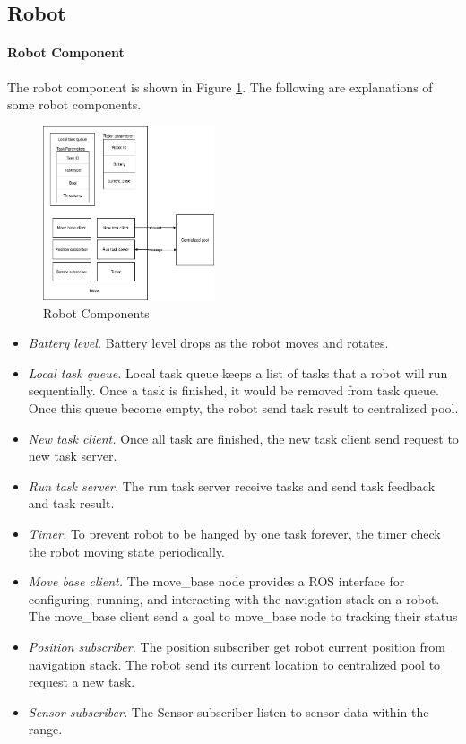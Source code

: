 \subsection{Robot}
\paragraph{Robot Component} The robot component is shown in Figure \ref{fig:robot_components}. The following are explanations of some robot components.


\begin{figure}[htbp]
	\centering
	\includegraphics[width = 0.45\textwidth]{content/images/ch4/system_component_robot.drawio.png}
	\caption{Robot Components}
	\label{fig:robot_components}
\end{figure}

\begin{itemize}
	\item \textsl{Battery level.} Battery level drops as the robot moves and rotates.
	\item \textsl{Local task queue.} Local task queue keeps a list of tasks that a robot will run sequentially. Once a task is finished, it would be removed from task queue. Once this queue become empty, the robot send task result to centralized pool.
	\item \textsl{New task client.} Once all task are finished, the new task client send request to new task server.
	\item \textsl{Run task server.} The run task server receive tasks and send task feedback and task result.
	\item \textsl{Timer.} To prevent robot to be hanged by one task forever, the timer check the robot moving state periodically.
	\item \textsl{Move base client.} The move\_base node provides a ROS interface for configuring, running, and interacting with the navigation stack on a robot. The move\_base client send a goal to move\_base node to tracking their status  
	\item \textsl{Position subscriber.} The position subscriber get robot current position from navigation stack. The robot send its current location to centralized pool to request a new task.
	\item \textsl{Sensor subscriber.} The Sensor subscriber listen to sensor data within the range.
\end{itemize}

